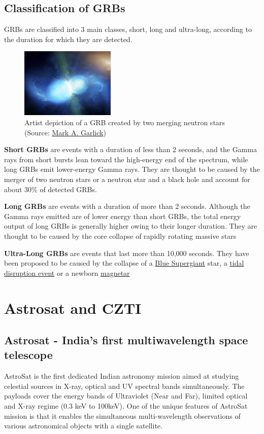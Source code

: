 \documentclass[11pt]{book} %
\begin{document}
\subsection{Classification of GRBs}
GRBs are classified into 3 main classes, short, long and ultra-long, according to the duration for which they are detected.

\begin{figure}
    \includegraphics[width=0.4\textwidth]{Pictures/neutronstars.jpg}
    \caption{Artist depiction of a GRB created by two merging neutron stars (Source: \href{http://www.markgarlick.com/index.html}{Mark A. Garlick})}
\end{figure}

\textbf{Short GRBs} are events with a duration of less than 2 seconds, and the Gamma rays from short bursts lean toward the high-energy end of the spectrum, while long GRBs emit lower-energy Gamma rays. They are thought to be caused by the merger of two neutron stars or a neutron star and a black hole and account for about 30\% of detected GRBs.


\textbf{Long GRBs} are events with a duration of more than 2 seconds. Although the Gamma rays emitted are of lower energy than short GRBs, the total energy output of long GRBs is generally higher owing to their longer duration. They are thought to be caused by the core collapse of rapidly rotating massive stars 

\textbf{Ultra-Long GRBs} are events that last more than 10,000 seconds. They have been proposed to be caused by the collapse of a \href{https://en.wikipedia.org/wiki/Blue_supergiant}{Blue Supergiant} star, a \href{https://en.wikipedia.org/wiki/Tidal_disruption_event}{tidal disruption event} or a newborn \href{https://en.wikipedia.org/wiki/Magnetar}{magnetar}

\section{Astrosat and CZTI}
\subsection{Astrosat - India's first multiwavelength space telescope}
AstroSat is the first dedicated Indian astronomy mission aimed at studying celestial sources in X-ray, optical and UV spectral bands simultaneously. The payloads cover the energy bands of Ultraviolet (Near and Far), limited optical and X-ray regime (0.3 keV to 100keV). One of the unique features of AstroSat mission is that it enables the simultaneous multi-wavelength observations of various astronomical objects with a single satellite.
\end{document}
